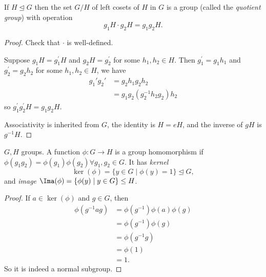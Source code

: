 \begin{proposition}
    If \(H \trianglelefteq G\) then the set \(G / H\) of left cosets of \(H\) in \(G\) is a group (called the \textit{quotient group}) with operation
\[
    g_1 H \cdot g_2 H = g_1 g_2 H.
\]
\end{proposition}
\begin{proof}
Check that \(\cdot\) is well-defined.

Suppose \(g_1 H = g_1 ^\prime H\) and \(g_2 H = g_2 ^\prime\) for some \(h_1, h_2 \in H\). Then \(g_1 ^\prime =g_1 h_1\) and \(g_2 ^\prime  = g_2 h_2\) for some \(h_1, h_2 \in H\), we have
\begin{align*}
    g_1' g_2' &= g_2h_1g_2h_2\\
    &=g_1 g_2 (g_2^{-1}h_2 g_2)h_2
\end{align*}
so \(g_1 ^\prime g_2 ^\prime  H = g_1 g_2 H\).

Associativity is inherited from \(G\), the identity is \(H = e H\), and the inverse of \(g H\) is \(g^{-1} H\).
\end{proof}

\begin{definition}[Homomorphism]
    \(G, H\) groups. A function \(\phi: G \to H\) is a group homomorphism if \(\phi(g_1 g_2) = \phi(g_1)\phi(g_2) \forall g_1, g_2 \in G\). It has \textit{kernel}
\[
    \ker(\phi) = \{y \in G \mid \phi(y) = 1\} \trianglelefteq G,
\]
and \textit{image} \(\Ima(\phi)= \{\phi(y)\mid y\in G\} \leq H\).
\end{definition}

\begin{proof}
If \(a \in \ker(\phi)\) and \(g \in G\), then
\begin{align*}
    \phi(g^{-1}ag) &= \phi(g^{-1})\phi(a)\phi(g)\\
    &= \phi(g^{-1}) \phi(g)\\
    &= \phi(g^{-1}g)\\
    &= \phi(1)\\
    &= 1.
\end{align*}
So it is indeed a normal subgroup.
\end{proof}